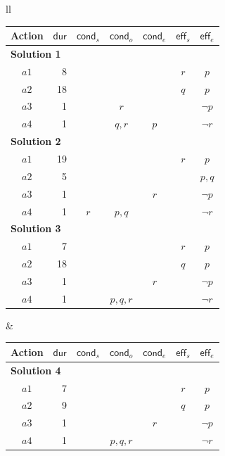 \documentclass[runningheads]{llncs}
\newcommand{\eff}{\mathsf{eff}}    %
\newcommand{\cond}{\mathsf{cond}}  %
\newcommand{\dur}{\mathsf{dur}}    %
\begin{document}
\begin{figure}
\footnotesize
\begin{tabular}{ll}
\hspace{-0.6cm}\begin{tabular}{cr|ccccc}
Action & $\dur$ & $\cond_s$ & $\cond_o$ & $\cond_e$ & $\eff_s$ & $\eff_e$ \\

\hline

\multicolumn{7}{l}{\bf Solution 1} \\
$a1$ & 8 & & & & $r$ & $p$ \\
$a2$ & 18 & & & & $q$ & $p$ \\
$a3$ & 1 & & $r$ & & & $\neg p$ \\
$a4$ & 1 & & $q,r$ & $p$ & & $\neg r$ \\

\hline

\multicolumn{7}{l}{\bf Solution 2} \\
$a1$ & 19 & & & & $r$ & $p$ \\
$a2$ & 5 & & & & & $p,q$ \\
$a3$ & 1 & & & $r$ & & $\neg p$ \\
$a4$ & 1 & $r$ & $p,q$ & & & $\neg r$ \\

\hline

\multicolumn{7}{l}{\bf Solution 3} \\
$a1$ & 7 & & & & $r$ & $p$ \\
$a2$ & 18 & & & & $q$ & $p$ \\
$a3$ & 1 & & & $r$  & & $\neg p$ \\
$a4$ & 1 & & $p,q,r$ & & & $\neg r$ \\
\end{tabular} &


\hspace{0.3cm}\begin{tabular}{cr|ccccc}  

Action & $\dur$ & $\cond_s$ & $\cond_o$ & $\cond_e$ & $\eff_s$ & $\eff_e$ \\

\hline

\multicolumn{7}{l}{\bf Solution 4} \\
$a1$ & 7 & & & & $r$ & $p$ \\
$a2$ & 9 & & & & $q$ & $p$ \\
$a3$ & 1 & & & $r$ & & $\neg p$ \\
$a4$ & 1 & & $p,q,r$ & & & $\neg r$ \\


\end{tabular}
\end{tabular}
\end{figure}
\end{document}
